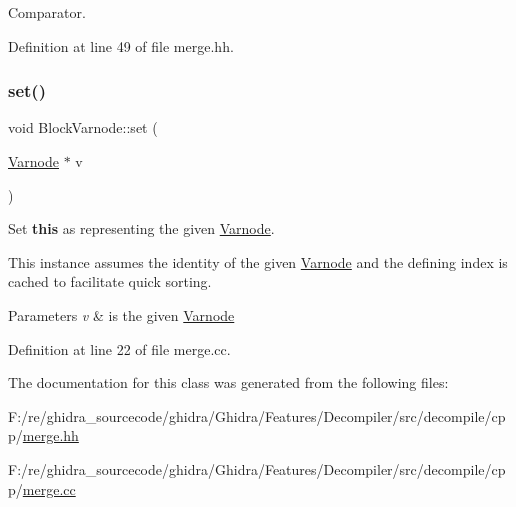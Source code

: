 Comparator. 



Definition at line 49 of file merge.\+hh.

\mbox{\label{class_block_varnode_af4aa0725ff5d05784b84fe6db6a69480}} 
\subsubsection{\texorpdfstring{set()}{set()}}
{\footnotesize\ttfamily void Block\+Varnode\+::set (\begin{DoxyParamCaption}\item[{\mbox{\hyperlink{class_varnode}{Varnode}} $\ast$}]{v }\end{DoxyParamCaption})}



Set {\bfseries{this}} as representing the given \mbox{\hyperlink{class_varnode}{Varnode}}. 

This instance assumes the identity of the given \mbox{\hyperlink{class_varnode}{Varnode}} and the defining index is cached to facilitate quick sorting. 
\begin{DoxyParams}{Parameters}
{\em v} & is the given \mbox{\hyperlink{class_varnode}{Varnode}} \\
\hline
\end{DoxyParams}


Definition at line 22 of file merge.\+cc.



The documentation for this class was generated from the following files\+:\begin{DoxyCompactItemize}
\item 
F\+:/re/ghidra\+\_\+sourcecode/ghidra/\+Ghidra/\+Features/\+Decompiler/src/decompile/cpp/\mbox{\hyperlink{merge_8hh}{merge.\+hh}}\item 
F\+:/re/ghidra\+\_\+sourcecode/ghidra/\+Ghidra/\+Features/\+Decompiler/src/decompile/cpp/\mbox{\hyperlink{merge_8cc}{merge.\+cc}}\end{DoxyCompactItemize}
